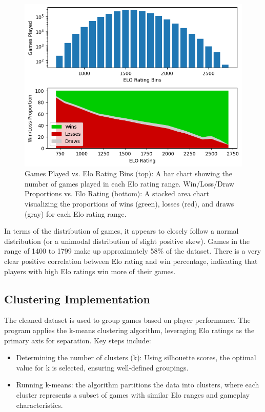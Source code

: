 \documentclass[conference]{IEEEtran}
\begin{document}
\begin{figure}[htbp]
\centerline{\includegraphics[scale=0.5]{Distribution and Win-Loss Proportion by Elo.png}}
\caption{Games Played vs. Elo Rating Bins (top): A bar chart showing the number of games played in each Elo rating range.
Win/Loss/Draw Proportions vs. Elo Rating (bottom): A stacked area chart visualizing the proportions of wins (green), losses (red), and draws (gray) for each Elo rating range.}
\label{fig:wl-prop}
\end{figure}

In terms of the distribution of games, it appears to closely follow a normal distribution (or a unimodal distribution of slight positive skew). Games in the range of 1400 to 1799 make up approximately 58\% of the dataset. There is a very clear positive correlation between Elo rating and win percentage, indicating that players with high Elo ratings win more of their games.

\subsection{Clustering Implementation}
 The cleaned dataset is used to group games based on player performance. The program applies the k-means clustering algorithm, leveraging Elo ratings as the primary axis for separation. Key steps include:
\begin{itemize}
    \item Determining the number of clusters (k): Using silhouette scores, the optimal value for k is selected, ensuring well-defined groupings.
    \item Running k-means: the algorithm partitions the data into clusters, where each cluster represents a subset of games with similar Elo ranges and gameplay characteristics.
\end{itemize}
\end{document}
